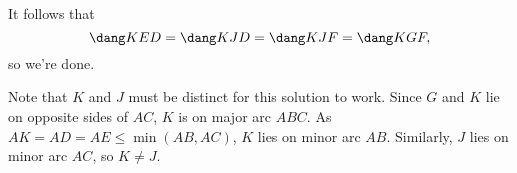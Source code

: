 It follows that
\[ \dang KED=\dang KJD=\dang KJF=\dang KGF, \]
so we're done.
\begin{remark*}
Note that $K$ and $J$ must be distinct for this solution to work.
Since $G$ and $K$ lie on opposite sides of $AC$, $K$ is on major arc $ABC$.
As $AK=AD=AE\le \min(AB,AC)$, $K$ lies on minor arc $AB$.
Similarly, $J$ lies on minor arc $AC$, so $K\neq J.$
\end{remark*}
\pagebreak
